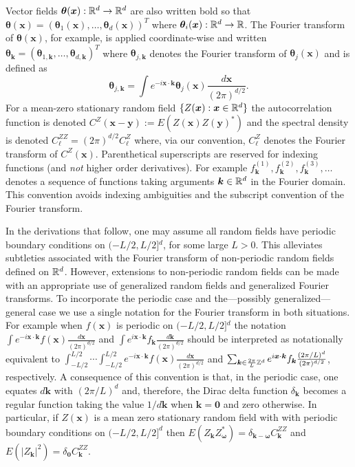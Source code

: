 \documentclass[10pt,noinfoline]{imsart}
\newcommand{\bs}{\boldsymbol}
\begin{document}
Vector fields  $\bs \theta(\bs x):\Bbb R^d\rightarrow \Bbb R^d$ are also written bold so that \mbox{$\bs \theta(\bs x)=(\bs\theta_{1}(\bs x),\ldots, \bs\theta_{d}(\bs x))^T$} where $\bs \theta_i(\bs x):\Bbb R^d\rightarrow \Bbb R$. The Fourier transform of $\bs \theta(\bs x)$, for example, is applied coordinate-wise and written $\bs \theta_{\bs k}=(\bs \theta_{1,\bs k},\ldots, \bs \theta_{d,\bs k})^T$ where $\bs \theta_{j,\bs k}$ denotes the Fourier transform of $\bs \theta_j(\bs x)$ and is defined as
\[
 \bs\theta_{j,\bs k}= \int e^{-i\bs x\cdot \bs k} \bs \theta_{j}(\bs x) \frac{d\bs x}{(2\pi)^{d/2}}.
 \]
For a mean-zero stationary random field $\{Z(\bs x): \bs x\in\Bbb R^d\}$ the autocorrelation function is denoted  $C^Z(\bs x-\bs y) := E(Z(\bs x)Z(\bs y)^*)$ and the spectral density is denoted $C_{\bs\ell}^{ZZ} = {(2\pi)}^{d/2} C_{\bs\ell}^Z$ where, via our convention, $C_{\bs\ell}^Z$ denotes the Fourier transform of $C^Z(\bs x)$.
Parenthetical superscripts are reserved for indexing functions (and \textit{not} higher order derivatives). For example $f^{(1)}_{\bs k}, f^{(2)}_{\bs k}, f^{(3)}_{\bs k}, \ldots$ denotes a sequence of functions taking arguments $\bs k\in \Bbb R^d$ in the Fourier domain. This convention avoids indexing ambiguities and the subscript convention of the Fourier transform.


In the derivations that follow, one may assume all random fields have periodic boundary conditions on $(-L/2, L/2]{}^d$, for some large $L>0$. This alleviates subtleties associated with the Fourier transform of non-periodic random fields defined on $\Bbb R^d$. However, extensions to non-periodic random fields can be made with an appropriate use of generalized random fields and generalized Fourier transforms. To incorporate the periodic case and the---possibly generalized---general case we use a single notation for the Fourier transform in both situations. For example when  $f(\bs x)$ is periodic on $(-L/2, L/2]{}^d$ the notation $\int e^{-i\bs x\cdot \bs k} f(\bs x)\frac{d\bs x}{(2\pi)^{d/2}}$ and $\int e^{i\bs x\cdot \bs k} f_{\bs k}\frac{d\bs k}{(2\pi)^{d/2}}$ should be interpreted as notationally equivalent to $\int_{-L/2}^{L/2}\cdots\int_{-L/2}^{L/2} e^{-i\bs x\cdot \bs k} f(\bs x)\frac{d\bs x}{(2\pi)^{d/2}}$ and  $\sum_{\bs k \in \frac{2\pi}{L}\Bbb Z^d }   e^{i \bs x\cdot \bs k}  f_{\bs k} \frac{(2\pi/ L){}^{d}}{(2\pi){}^{d/2}} $, respectively. A consequence of this convention is that, in the periodic case, one equates $d\bs k$ with $(2\pi / L)^d$ and, therefore,  the Dirac delta function $\delta_{\bs k}$ becomes a regular function taking the value $1/d\bs k$ when $\bs k=\bs 0$ and zero otherwise. In particular, if $Z(\bs x)$ is a mean zero stationary random field with with periodic boundary conditions on $(-L/2, L/2]^d$ then $E(Z_{\bs k}^{\phantom{*}} Z^{*}_{\bs \omega}) = \delta_{\bs k-\bs \omega}C_{\bs k}^{ZZ}$
and $E(|Z_{\bs k}|^2) = \delta_{\bs 0}C_{\bs k}^{ZZ}$.
\end{document}
